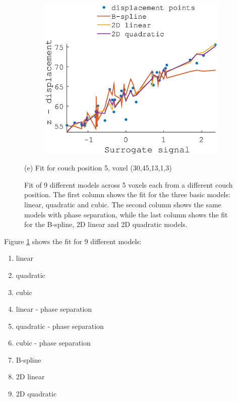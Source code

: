 \documentclass[11pt,a4paper,oneside]{report}
\begin{document}
\begin{figure}[H]
\begin{subfigure}[b]{0.33\textwidth}
  \end{subfigure}
    ~ %
  \begin{subfigure}[b]{0.33\textwidth}
    \includegraphics[width=\textwidth, trim=0 0 0 110,clip=true]{figures/task2/fit_round3_couch5.eps}
  \end{subfigure}
  (e) Fit for couch position 5, voxel (30,45,13,1,3)
  \vspace*{1em}

  
  \caption{Fit of 9 different models across 5 voxels each from a different couch position. The first column shows the fit for the three basic models: linear, quadratic and cubic. The second column shows the same models with phase separation, while the last column shows the fit for the B-spline, 2D linear and 2D quadratic models.}
  \label{fig:c2fit}
  
\end{figure}

Figure \ref{fig:c2fit} shows the fit for 9 different models:
\begin{multicols}{3}
\begin{enumerate}
 \item linear
 \item quadratic
 \item cubic
 \item linear - phase separation
 \item quadratic - phase separation
 \item cubic - phase separation
 \item B-spline
 \item 2D linear
 \item 2D quadratic
\end{enumerate}
\end{multicols}
\end{document}
